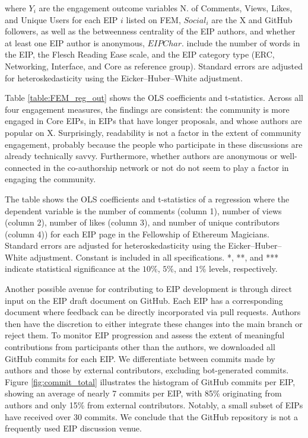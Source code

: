 \documentclass[No]{AEA}
\begin{document}
where $Y_i$ are the engagement outcome variables N. of Comments, Views, Likes, and Unique Users for each EIP $i$ listed on FEM, $Social_i$ are the X and GitHub followers, as well as the betweenness centrality of the EIP authors, and whether at least one EIP author is anonymous, $EIP Char.$ include the number of words in the EIP, the Flesch Reading Ease scale, and the EIP category type (ERC, Networking, Interface, and Core as reference group). Standard errors are adjusted for heteroskedasticity using the Eicker–Huber–White adjustment. 

Table \ref{table:FEM_reg_out} shows the OLS coefficients and t-statistics. Across all four engagement measures, the findings are consistent: the community is more engaged in Core EIPs, in EIPs that have longer proposals, and whose authors are popular on X. Surprisingly, readability is not a factor in the extent of community engagement, probably because the people who participate in these discussions are already technically savvy. Furthermore, whether authors are anonymous or well-connected in the co-authorship network or not do not seem to play a factor in engaging the community. 


\begin{table}[ht!]
    \caption{Determinants of Community Engagement}
     \begin{small}
    \begin{minipage}{\textwidth}
      The table shows the OLS coefficients and t-statistics of a regression where the dependent variable is the number of comments (column 1), number of views (column 2), number of likes (column 3), and number of unique contributors (column 4)) for each EIP page in the Fellowship of Ethereum Magicians. Standard errors are adjusted for heteroskedasticity using the Eicker–Huber–White adjustment. Constant is included in all specifications. *, **, and *** indicate statistical significance at the $10\%$, $5\%$, and $1\%$ levels, respectively.   
  \end{minipage}
    
    \label{table:FEM_reg_out}
         \end{small}
\end{table}


Another possible avenue for contributing to EIP development is through direct input on the EIP draft document on GitHub. Each EIP has a corresponding document where feedback can be directly incorporated via pull requests. Authors then have the discretion to either integrate these changes into the main branch or reject them. To monitor EIP progression and assess the extent of meaningful contributions from participants other than the authors, we downloaded all GitHub commits for each EIP. We differentiate between commits made by authors and those by external contributors, excluding bot-generated commits. Figure \ref{fig:commit_total} illustrates the histogram of GitHub commits per EIP, showing an average of nearly 7 commits per EIP, with 85\% originating from authors and only 15\% from external contributors. Notably, a small subset of EIPs have received over 30 commits. We conclude that the GitHub repository is not a frequently used EIP discussion venue.
\end{document}

